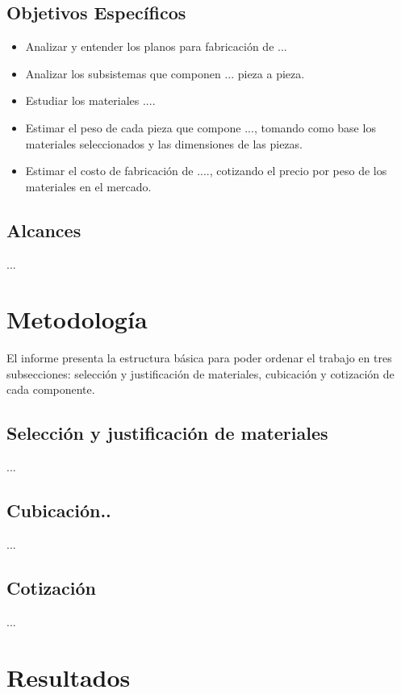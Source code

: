 \documentclass[12pt]{article}
\begin{document}
\subsection{Objetivos Específicos}
\begin{itemize}
\item Analizar y entender los planos para fabricación de ...
\item Analizar los subsistemas que componen ... pieza a pieza.
\item Estudiar los materiales ....
\item Estimar el peso de cada pieza que compone ..., tomando como base los materiales seleccionados y las dimensiones de las piezas.
\item Estimar el costo de fabricación de ...., cotizando el precio por peso de los materiales en el mercado. 
\end{itemize}
\subsection{Alcances}
\qquad ...
\newpage
\section{Metodología}

\qquad El informe presenta la estructura básica para poder ordenar el trabajo en tres subsecciones: selección y justificación de materiales, cubicación y cotización de cada componente. 

\subsection{Selección y justificación de materiales}

\qquad ...

\subsection{Cubicación..}

\qquad ...


\subsection{Cotización}

\qquad ...



\newpage
\section{Resultados}
\end{document}
